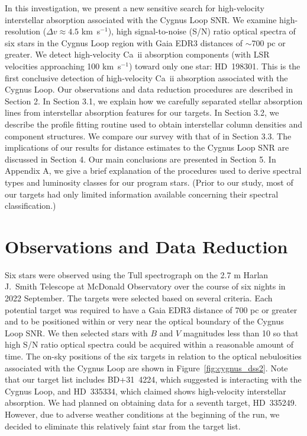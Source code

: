 \documentclass[fleqn,usenatbib]{mnras}
\begin{document}
In this investigation, we present a new sensitive search for high-velocity interstellar absorption associated with the Cygnus Loop SNR. We examine high-resolution ($\Delta v\approx4.5$ km~s$^{-1}$), high signal-to-noise (S/N) ratio optical spectra of six stars in the Cygnus Loop region with Gaia EDR3 distances of $\sim$700 pc or greater. We detect high-velocity Ca~{\sc ii} absorption components (with LSR velocities approaching 100 km~s$^{-1}$) toward only one star: HD~198301. This is the first conclusive detection of high-velocity Ca~{\sc ii} absorption associated with the Cygnus Loop. Our observations and data reduction procedures are described in Section 2. In Section 3.1, we explain how we carefully separated stellar absorption lines from interstellar absorption features for our targets. In Section 3.2, we describe the profile fitting routine used to obtain interstellar column densities and component structures. We compare our survey with that of \citet{w02} in Section 3.3. The implications of our results for distance estimates to the Cygnus Loop SNR are discussed in Section 4. Our main conclusions are presented in Section 5. In Appendix A, we give a brief explanation of the procedures used to derive spectral types and luminosity classes for our program stars. (Prior to our study, most of our targets had only limited information available concerning their spectral classification.)

\section{Observations and Data Reduction}
Six stars were observed using the Tull spectrograph \citep[TS23;][]{t95} on the 2.7 m Harlan J.~Smith Telescope at McDonald Observatory over the course of six nights in 2022 September. The targets were selected based on several criteria. Each potential target was required to have a Gaia EDR3 distance of 700 pc or greater and to be positioned within or very near the optical boundary of the Cygnus Loop SNR. We then selected stars with $B$ and $V$ magnitudes less than 10 so that high S/N ratio optical spectra could be acquired within a reasonable amount of time. The on-sky positions of the six targets in relation to the optical nebulosities associated with the Cygnus Loop are shown in Figure~\ref{fig:cygnus_dss2}. Note that our target list includes BD+31~4224, which \citet{f18a} suggested is interacting with the Cygnus Loop, and HD~335334, which \citet{f18b} claimed shows high-velocity interstellar absorption. We had planned on obtaining data for a seventh target, HD~335249. However, due to adverse weather conditions at the beginning of the run, we decided to eliminate this relatively faint star from the target list.
\end{document}
